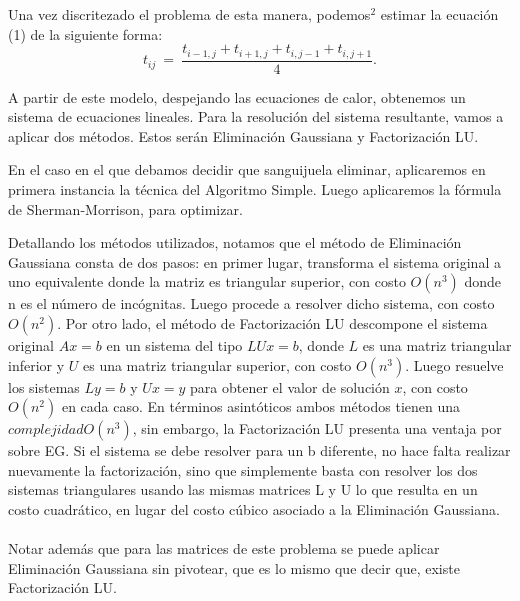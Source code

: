 Una vez discritezado el problema de esta manera, podemos$^2$ estimar la ecuación (1) de la siguiente forma:
\begin{equation}
t_{ij} \ =\ \frac{ t_{i-1,j} + t_{i+1,j} + t_{i,j-1} + t_{i,j+1}}{4}.\label{eq:calordd}
\end{equation}



A partir de este modelo, despejando las ecuaciones de calor, obtenemos un sistema de ecuaciones lineales.
Para la resolución del sistema resultante, vamos a aplicar dos métodos. Estos serán Eliminación Gaussiana y Factorización LU.

En el caso en el que debamos decidir que sanguijuela eliminar, aplicaremos en primera instancia la técnica del Algoritmo Simple. Luego aplicaremos
la fórmula de Sherman-Morrison, para optimizar. 

Detallando los métodos utilizados, notamos que el método de Eliminación Gaussiana consta de dos pasos: en primer
lugar, transforma el sistema original a uno equivalente donde la matriz es triangular
superior, con costo $O(n^3)$ donde n es el número de incógnitas. Luego procede a resolver dicho
sistema, con costo $O(n^2)$. Por otro lado, el método de Factorización LU descompone el sistema original
$Ax = b$ en un sistema del tipo $LUx = b$, donde $L$ es una matriz triangular inferior y $U$ es una matriz
triangular superior, con costo $O(n^3)$. Luego resuelve los sistemas $Ly = b$ y
$Ux = y$ para obtener el valor de solución $x$, con costo $O(n^2)$ en cada caso. 
En términos asintóticos ambos métodos tienen una $complejidad O(n^3)$, sin embargo, la Factorización LU presenta 
una ventaja por sobre EG. Si el sistema se debe resolver para un b diferente, no hace falta realizar nuevamente la factorización,
sino que simplemente basta con resolver los dos sistemas triangulares usando las mismas matrices L y
U lo que resulta en un costo cuadrático, en lugar del costo cúbico asociado a la Eliminación Gaussiana. \\\\

Notar además que para las matrices de este problema se puede aplicar Eliminación Gaussiana sin pivotear, que es lo mismo que decir que, existe Factorización LU.
